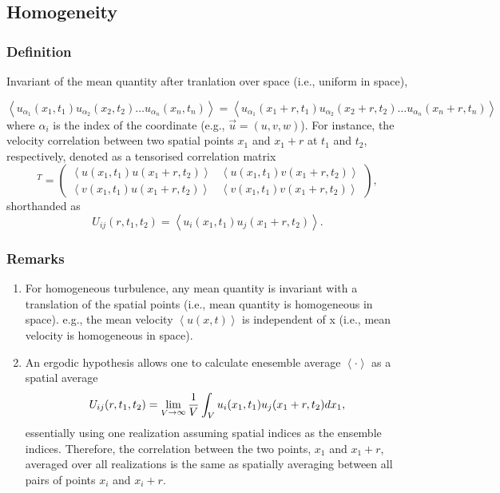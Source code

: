 \subsection{Homogeneity}
\subsubsection{Definition} Invariant of the mean quantity after tranlation over space (i.e., uniform in space),

\begin{equation}
   \left< u_{\alpha_1}(x_1,t_1) u_{\alpha_2}(x_2,t_2) \dotsc u_{\alpha_n}(x_n,t_n) \right> = \left< u_{\alpha_1}(x_1+r,t_1) u_{\alpha_2}(x_2+r,t_2) \dotsc u_{\alpha_n}(x_n+r,t_n) \right>
\end{equation}
where $\alpha_i$ is the index of the coordinate (e.g., $\vec{u}=(u,v,w)$).
For instance, the velocity correlation between two spatial points $x_1$ and $x_1+r$ at $t_1$ and $t_2$, respectively, denoted as a tensorised correlation matrix
\begin{equation}
   [(u(x_1,t_1))^i, (v(x_1,t_1))^i] [(u(x_1+r,t_2))^i, (v(x_1+r,t_2))^i]^T = 
   \left( 
   \begin{array}{cc}
      \left<u(x_1,t_1)u(x_1+r,t_2)\right> & \left<u(x_1,t_1)v(x_1+r,t_2)\right> \\
      \left<v(x_1,t_1)u(x_1+r,t_2)\right> & \left<v(x_1,t_1)v(x_1+r,t_2)\right>
   \end{array}
   \right),
\end{equation}
shorthanded as
\begin{equation}
   U_{ij}(r,t_1,t_2) = \left< u_i(x_1,t_1)u_j(x_1+r,t_2) \right>.
\end{equation}

\subsubsection{Remarks} 
\begin{enumerate}
   \item For homogeneous turbulence, any mean quantity is invariant with a translation of the spatial points (i.e., mean quantity is homogeneous in space). 
         e.g., the mean velocity $\left< u(x,t) \right>$ is independent of x (i.e., mean velocity is homogeneous in space).
   \item An ergodic hypothesis allows one to calculate enesemble average $\left< \cdot \right>$ as a spatial average 
         \begin{equation}
            U_{ij}(r,t_1,t_2) = \lim_{\substack V \rightarrow \infty} \frac{1}{V}\int_V u_i(x_1,t_1)u_j(x_1+r,t_2) dx_1,
         \end{equation}
         essentially using one realization assuming spatial indices as the ensemble indices.
         Therefore, the correlation between the two points, $x_1$ and $x_1+r$, averaged over all realizations is the same as spatially averaging between all pairs of points $x_i$ and $x_i+r$.
\end{enumerate}
